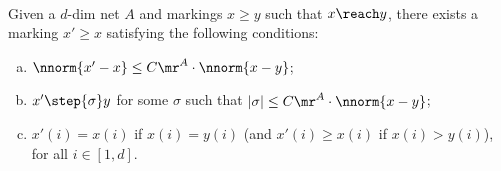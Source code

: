 	\begin{prop}\label{prop:simpletrick}
	\hfill\\
	Given a $d$-dim net $A$ and markings $x\geq y$ such that $x\reach y$, 
there exists a marking $x'\geq x$ satisfying the following conditions:
\begin{enumerate}[a)]	
	\item $\nnorm{x'-x}\leq C\mr^A\cdot \nnorm{x-y}$; 
		\item
			$x'\step{\sigma}y$ for some $\sigma$ 
			such that $|\sigma|\leq
			C\mr^A\cdot\nnorm{x-y}$;
		\item $x'(i)=x(i)$ if $x(i)=y(i)$
			(and $x'(i)\geq x(i)$ if $x(i)>y(i)$), for all
			$i\in[1,d]$.
\end{enumerate}
\end{prop}
